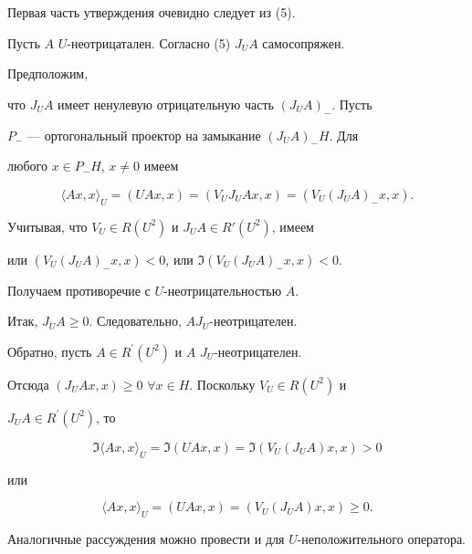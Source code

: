 \begin{pf}


Первая часть утверждения очевидно следует из (5).





Пусть $A$\; $U$-неотрицатален. Согласно (5) $J_{U}A$ самосопряжен.


Предположим,


что $J_{U}A$ имеет ненулевую отрицательную часть $(J_{U}A)_{-}$. Пусть


$P_{-}$ --- ортогональный проектор на замыкание $(J_{U}A)_{-}H$. Для


любого $x\in P_{-}H$, $x\ne 0$ имеем


$$


\langle Ax,x\rangle_{U}=(UAx,x)=(V_{U}J_{U}Ax,x)=(V_{U}(J_{U}A)_{-}x,x).


$$


Учитывая, что $V_{U}{\in} R(U^{2})$ и $J_{U}A{\in} R'(U^{2})$, имеем


или $(V_{U}(J_{U}A)_{-}x,x){<}0$, или $\Im (V_{U}(J_{U}A)_{-}x,x){<}0$.


Получаем противоречие с $U$-неотрицательностью $A$.


Итак, $J_{U}A\geq 0$. Следовательно, $A$\linebreak $J_{U}$-неотрицателен.





Обратно, пусть $A\in R^{\prime}(U^{2})$ и $A$\; $J_{U}$-неотрицателен.


Отсюда $(J_{U}Ax,x)\geq 0$ $\forall x\in H$. Поскольку $V_{U}\in R(U^{2})$ и


$J_{U}A\in R^{\prime}(U^{2})$, то


$$


\Im\langle Ax,x\rangle_{U}=\Im (UAx,x)=\Im (V_{U}(J_{U}A)x,x)> 0


$$


или


$$


\langle Ax,x\rangle_{U}= (UAx,x)= (V_{U}(J_{U}A)x,x)\geq 0.


$$





Аналогичные рассуждения можно провести и для $U$-неположительного оператора.


\end{pf}





